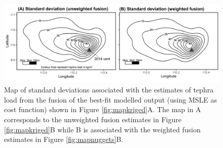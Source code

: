 \documentclass[a4paper,fleqn]{cas-sc}
\begin{document}
    \begin{figure}[htbp!]
    \centering
    \includegraphics[width=\linewidth]{Figures/fig13_kriging-standarddev.png}
    \caption{Map of standard deviations associated with the estimates of tephra load from the fusion of the best-fit modelled output (using MSLE as cost function) shown in Figure \ref{fig:mapkriged}A. The map in A corresponds to the unweighted fusion estimates in Figure \ref{fig:mapkriged}B while B is associated with the weighted fusion estimates in Figure \ref{fig:mapnuggets}B. }
    \label{fig:mapkrig-sd}
    \end{figure}






\end{document}
